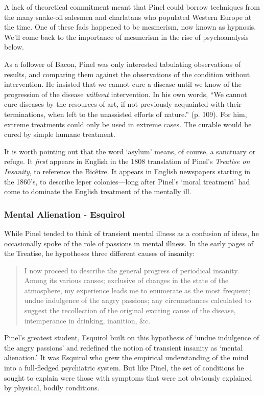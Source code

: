 \begin{refsection}
A lack of theoretical commitment meant that Pinel could borrow techniques from the many snake-oil salesmen and charlatans who populated Western Europe at the time. One of these fads happened to be mesmerism, now known as hypnosis. We'll come back to the importance of mesmerism in the rise of psychoanalysis below.

As a follower of Bacon, Pinel was only interested tabulating observations of results, and comparing them against the observations of the condition without intervention. He insisted that we cannot cure a disease until we know of the progression of the disease \emph{without} intervention. In his own words, ``We cannot cure diseases by the resources of art, if not previously acquainted with their terminations, when left to the unassisted efforts of nature.'' (p. 109). For him, extreme treatments could only be used in extreme cases. The curable would be cured by simple humane treatment.

It is worth pointing out that the word `asylum' means, of course, a sanctuary or refuge. It \emph{first} appears in English in the 1808 translation of Pinel's \emph{Treatise on Insanity}, to reference the Bicêtre. It appears in English newspapers starting in the 1860's, to describe leper colonies---long after Pinel's `moral treatment' had come to dominate the English treatment of the mentally ill.

\subsubsection{Mental Alienation - Esquirol}
\label{mentalalienation-esquirol}

While Pinel tended to think of transient mental illness as a confusion of ideas, he occasionally spoke of the role of passions in mental illness. In the early pages of the Treatise, he hypotheses three different causes of insanity:

\begin{quote}

I now proceed to describe the general progress of periodical insanity. Among its various causes; exclusive of changes in the state of the atmosphere, my experience leads me to enumerate as the most frequent; undue indulgence of the angry passions; any circumstances calculated to suggest the recollection of the original exciting cause of the disease, intemperance in drinking, inanition, \&c. ~\citep[p. 12]{Pinel:1806ws}
\end{quote}

Pinel's greatest student, Esquirol built on this hypothesis of `undue indulgence of the angry passions' and redefined the notion of transient insanity as `mental alienation.' It was Esquirol who grew the empirical understanding of the mind into a full-fledged psychiatric system. But like Pinel, the set of conditions he sought to explain were those with symptoms that were not obviously explained by physical, bodily conditions.


\end{refsection}
